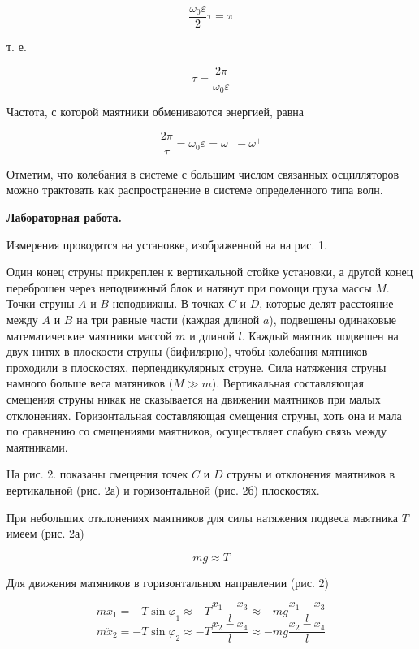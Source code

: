 \documentclass[14pt]{article}
\begin{document}
$$\frac{\omega_0\varepsilon}{2}\tau = \pi$$

\noindent т. е.

\begin{equation}\label{tau}
\tau = \frac{2\pi}{\omega_0\varepsilon}
\end{equation}

Частота, с которой маятники обмениваются энергией, равна

$$\frac{2\pi}{\tau} = \omega_0\varepsilon = \omega^- - \omega^+$$

Отметим, что колебания в системе с большим числом связанных осцилляторов можно трактовать как распространение в системе определенного типа волн.


\setcounter{equation}{0}
\newpage

%
%

\textbf{Лабораторная работа.}

Измерения проводятся на установке, изображенной на на рис. 1.

Один конец струны прикреплен к вертикальной стойке установки, а другой конец переброшен через неподвижный блок и натянут при помощи груза массы 
$M$. Точки струны $A$ и $B$ неподвижны. В точках $C$ и $D$, которые делят расстояние между $A$ и $B$ на три равные части (каждая длиной $a$), подвешены одинаковые математические маятники массой $m$ и длиной $l$. Каждый маятник подвешен на двух нитях в плоскости струны (бифилярно), чтобы колебания мятников проходили в плоскостях, перпендикулярных струне. Сила натяжения струны намного больше веса матяников ($M \gg m$). Вертикальная составляющая смещения струны никак не сказывается на движении маятников при малых отклонениях. Горизонтальная составляющая смещения струны, хоть она и мала по сравнению со смещениями маятников, осуществляет слабую связь между маятниками.

На рис. 2. показаны смещения точек $C$ и $D$ струны и отклонения маятников в вертикальной (рис. 2а) и горизонтальной (рис. 2б) плоскостях. 

При небольших отклонениях маятников для силы натяжения подвеса маятника $T$ имеем (рис. 2а)

\begin{equation}
mg \approx T
\end{equation}

Для движения матяников в горизонтальном направлении (рис. 2)

\begin{equation}
m\ddot x_1 = -T\sin\varphi_1 \approx -T\frac{x_1 - x_3}{l} \approx -mg\frac{x_1 - x_3}{l}
\end{equation}
\begin{equation}
m\ddot x_2 = -T\sin\varphi_2 \approx -T\frac{x_2 - x_4}{l} \approx -mg\frac{x_2 - x_4}{l}
\end{equation}
\end{document}
